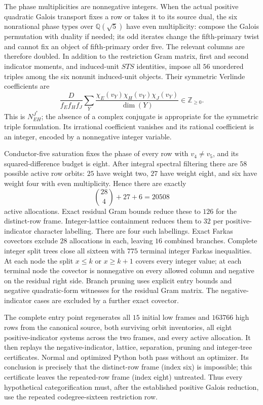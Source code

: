 The phase multiplicities are nonnegative integers.  When the actual
positive quadratic Galois transport fixes a row or takes it to its source dual,
the six nonrational phase types over $\mathbb Q(\sqrt5)$ have even
multiplicity: compose the Galois permutation with duality if needed;
its odd iterates change the fifth-primary twist and cannot fix an
object of fifth-primary order five.  The relevant columns are
therefore doubled.  In addition to the restriction Gram matrix,
first and second indicator moments, and induced-unit $STS$
identities, impose all $56$ unordered triples among the six nonunit
induced-unit objects.  Their symmetric Verlinde coefficients are
\[
 \frac{D}{f_Ef_Hf_J}\sum_Y
 \frac{\chi_E(v_Y)\chi_H(v_Y)\chi_J(v_Y)}{\dim(Y)}
       \in\mathbb Z_{\geq0}.
\]
This is $N_{EH}^{J^*}$; the absence of a complex conjugate is
appropriate for the symmetric triple formulation.  Its irrational
coefficient vanishes and its rational coefficient is an integer,
encoded by a nonnegative integer variable.

Conductor-five saturation fixes the phase of every row with
$v_4\ne v_5$, and its squared-difference budget is eight.
After integral spectral filtering there are $58$ possible active
row orbits: $25$ have weight two, $27$ have weight eight, and six
have weight four with even multiplicity.  Hence there are exactly
\[
 \binom{28}{4}+27+6=20508
\]
active allocations.  Exact residual Gram bounds reduce these to
$126$ for the distinct-row frame.  Integer-lattice containment
reduces them to $32$ per positive-indicator character labelling.
There are four such labellings.  Exact Farkas covectors exclude
$28$ allocations in each, leaving $16$ combined branches.  Complete
integer split trees close all sixteen with $775$ terminal integer
Farkas inequalities.  At each node the split $x\leq k$ or
$x\geq k+1$ covers every integer value; at each terminal node the
covector is nonnegative on every allowed column and negative on
the residual right side.  Branch pruning uses explicit entry
bounds and negative quadratic-form witnesses for the residual
Gram matrix.  The negative-indicator cases are excluded by a
further exact covector.

The complete entry point
regenerates all $15$ initial low frames and $163766$ high rows from
the canonical source, both surviving orbit inventories, all eight
positive-indicator systems across the two frames, and every active
allocation.  It then replays the negative-indicator, lattice,
separation, pruning and integer-tree certificates.  Normal and
optimized Python both pass without an optimizer.  Its conclusion
is precisely that the distinct-row frame (index six) is impossible;
this certificate leaves the repeated-row frame (index eight) untreated.
Thus every
hypothetical categorification must, after the established positive
Galois reduction, use the repeated codegree-sixteen restriction row.

